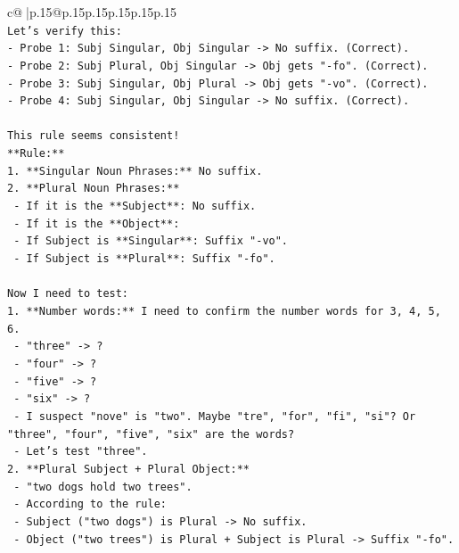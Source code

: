 \documentclass{article}
\begin{document}
{\begin{supertabular}{c@{$\;$}|p{.15\linewidth}@{}p{.15\linewidth}p{.15\linewidth}p{.15\linewidth}p{.15\linewidth}p{.15\linewidth}}
{{{\\ 
\texttt{Let's verify this:} \\
\texttt{{-} Probe 1: Subj Singular, Obj Singular {-}> No suffix. (Correct).} \\
\texttt{{-} Probe 2: Subj Plural, Obj Singular {-}> Obj gets "{-}fo". (Correct).} \\
\texttt{{-} Probe 3: Subj Singular, Obj Plural {-}> Obj gets "{-}vo". (Correct).} \\
\texttt{{-} Probe 4: Subj Singular, Obj Singular {-}> No suffix. (Correct).} \\
\\ 
\texttt{This rule seems consistent!} \\
\texttt{**Rule:**} \\
\texttt{1.  **Singular Noun Phrases:** No suffix.} \\
\texttt{2.  **Plural Noun Phrases:**} \\
\texttt{    {-} If it is the **Subject**: No suffix.} \\
\texttt{    {-} If it is the **Object**:} \\
\texttt{        {-} If Subject is **Singular**: Suffix "{-}vo".} \\
\texttt{        {-} If Subject is **Plural**: Suffix "{-}fo".} \\
\\ 
\texttt{Now I need to test:} \\
\texttt{1.  **Number words:** I need to confirm the number words for 3, 4, 5, 6.} \\
\texttt{    {-} "three" {-}> ?} \\
\texttt{    {-} "four" {-}> ?} \\
\texttt{    {-} "five" {-}> ?} \\
\texttt{    {-} "six" {-}> ?} \\
\texttt{    {-} I suspect "nove" is "two". Maybe "tre", "for", "fi", "si"? Or "three", "four", "five", "six" are the words?} \\
\texttt{    {-} Let's test "three".} \\
\texttt{2.  **Plural Subject + Plural Object:**} \\
\texttt{    {-} "two dogs hold two trees".} \\
\texttt{    {-} According to the rule:} \\
\texttt{        {-} Subject ("two dogs") is Plural {-}> No suffix.} \\
\texttt{        {-} Object ("two trees") is Plural + Subject is Plural {-}> Suffix "{-}fo".} \\
}}}
\end{supertabular}}
\end{document}

